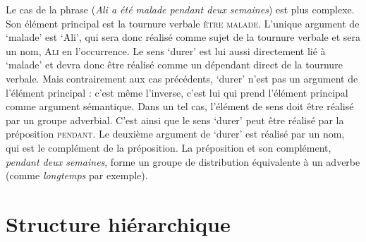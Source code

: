 Le cas de la phrase  (\textit{Ali a été malade pendant deux semaines}) est plus complexe. Son élément principal est la tournure verbale \textsc{être} \textsc{malade}. L’unique argument de ‘malade’ est ‘Ali’, qui sera donc réalisé comme sujet de la tournure verbale et sera un nom, \textsc{Ali} en l’occurrence. Le sens ‘durer’ est lui aussi directement lié à ‘malade’ et devra donc être réalisé comme un dépendant direct de la tournure verbale. Mais contrairement aux cas précédents, ‘durer’ n’est pas un argument de l’élément principal : c’est même l’inverse, c’est lui qui prend l’élément principal comme argument sémantique. Dans un tel cas, l’élément de sens doit être réalisé par un groupe adverbial. C’est ainsi que le sens ‘durer’ peut être réalisé par la préposition \textsc{pendant}. Le deuxième argument de ‘durer’ est réalisé par un nom, qui est le complément de la préposition. La préposition et son complément, \textit{pendant deux semaines}, forme un groupe de distribution équivalente à un adverbe (comme \textit{longtemps} par exemple).

\section{Structure hiérarchique}\label{sec:1.2.9}

